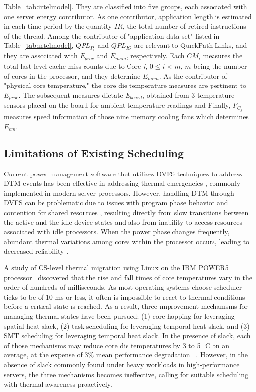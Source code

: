 \documentclass[times, 10pt,twocolumn]{IEEEtran}
\begin{document}
Table~\ref{tab:intelmodel}.  They are classified into five groups, each
associated with one server energy contributor.  As one contributor,
application length is estimated in each time period by the quantity
$IR$, the total number of retired instructions of the thread.  Among the
contributor of "application data set" listed in
Table~\ref{tab:intelmodel}, $QPL_{P_{t}}$ and $QPL_{IO}$ are relevant to
QuickPath Links, and they are associated with $E_{proc}$ and $E_{mem}$,
respectively.  Each $CM_{i}$ measures the total last-level cache miss
counts due to Core \textit{i}, $0 \leq i$ < $m$, $m$ being the number
of cores in the processor, and they determine $E_{mem}$.  As the
contributor of "physical core temperature," the core die temperature
measures are pertinent to $E_{proc}$.  The subsequent measures dictate
$E_{board}$, obtained from 3 temperature sensors placed on the board for
ambient temperature readings and Finally, $F_{C_{j}}$ measures speed
information of those nine memory cooling fans which determines $E_{em}$.

\subsection{Limitations of Existing Scheduling}
\label{sec:shortc-comp-workl}
Current power management software that utilizes DVFS techniques to
address DTM events has been effective in addressing thermal emergencies
\cite{Donald2006,Hanson2007}, commonly implemented in modern server
processors.  However, handling DTM through DVFS
can be problematic due to issues with program phase behavior and
contention for shared resources \cite{Bircher2008,Coskun2008d},
resulting directly from slow transitions between the active and the idle
device states and also from inability to access resources associated
with idle processors.  When the power phase changes frequently, abundant
thermal variations among cores within the processor occurs, leading to
decreased reliability \cite{Coskun2008d,Kursun2009}.

A study of OS-level thermal migration using Linux on the IBM POWER5
processor~\cite{Choi2007} discovered that the rise and fall times of
core temperatures vary in the order of hundreds of milliseconds.  As
most operating systems choose scheduler ticks to be of 10 ms or less, it
often is impossible to react to thermal conditions before a critical
state is reached.  As a result, three improvement mechanisms for
managing thermal states have been pursued: (1) core hopping for
leveraging spatial heat slack, (2) task scheduling for leveraging
temporal heat slack, and (3) SMT scheduling for leveraging temporal heat
slack.  In the presence of slack, each of those mechanisms may reduce
core die temperatures by 3 to 5$^{\circ}$ C on an average, at the
expense of 3\% mean performance degradation ~\cite{Choi2007,Ayoub2011}.
However, in the absence of slack commonly found under heavy workloads in
high-performance servers, the three mechanisms becomes ineffective,
calling for suitable scheduling with thermal awareness proactively.
\end{document}
